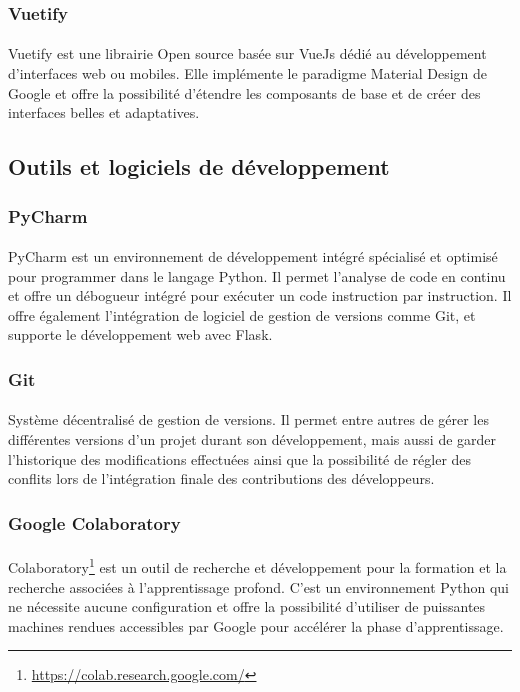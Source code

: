 		\subsubsection*{Vuetify}
		\paragraph{}
		Vuetify est une librairie Open source basée sur VueJs dédié au développement d'interfaces web ou mobiles. Elle implémente le paradigme Material Design de Google et offre la possibilité d'étendre les composants de base et de créer des interfaces belles et adaptatives.
	\subsection{Outils et logiciels de développement}
		\subsubsection*{PyCharm}
		\paragraph{}
		PyCharm est un environnement de développement intégré spécialisé et optimisé pour programmer dans le langage Python. Il permet l'analyse de code en continu et offre un débogueur intégré pour exécuter un code instruction par instruction. Il offre également l'intégration de logiciel de gestion de versions comme Git, et supporte le développement web avec Flask.
		
		\subsubsection*{Git}
		\paragraph{}
		Système décentralisé de gestion de versions. Il permet entre autres de gérer les différentes versions d'un projet durant son développement, mais aussi de garder l'historique des modifications effectuées ainsi que la possibilité de régler des conflits lors de l'intégration finale des contributions des développeurs.
		
		\subsubsection*{Google Colaboratory}
		\paragraph{}
		Colaboratory\footnote{\url{https://colab.research.google.com/}} est un outil de recherche et développement pour la formation et la recherche associées à l'apprentissage profond. C'est un environnement Python qui ne nécessite aucune configuration et offre la possibilité d'utiliser de puissantes machines rendues accessibles par Google pour accélérer la phase d'apprentissage.
		
